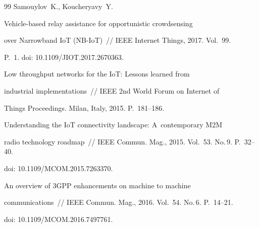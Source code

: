 {{\begin{thebibliography}{99}
{Samouylov~K.,  Koucheryavy~Y.} 


Vehicle-based relay assistance for opportunistic crowdsensing 


over Narrowband IoT (NB-IoT)~/\!\!/ IEEE Internet Things, 2017. Vol.~99. 


P.~1. doi: 10.1109\!/\!JIOT.2017.2670363.


    






Low throughput networks for the IoT: Lessons learned from 


industrial implementations~/\!\!/ IEEE 2nd World Forum on Internet of 


Things Proceedings. Milan, Italy, 2015. P.~181--186.


    






Understanding the IoT connectivity landscape: A~contemporary M2M 


radio technology roadmap~/\!\!/ IEEE Commun. Mag.,  2015. Vol.~53. No.\,9.  P.~32--40.


doi: 10.1109/MCOM.2015.7263370.


    






An overview of 3GPP enhancements on machine to machine 


communications~/\!\!/ IEEE Commun. Mag., 2016. Vol.~54. No.\,6. P.~14--21.


doi: 10.1109\!/\!MCOM.2016.7497761.


    


    


    







\end{thebibliography}}}
